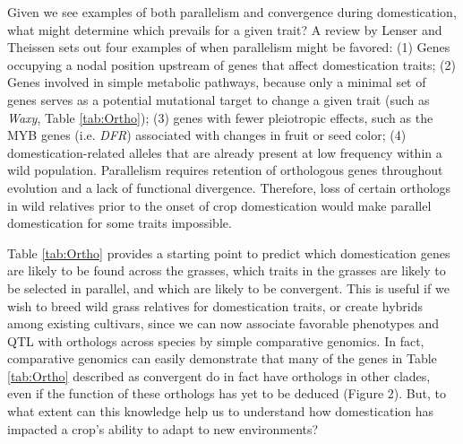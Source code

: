 \documentclass[12pt]{article}
\begin{document}
Given we see examples of both parallelism and convergence during domestication, what might determine which prevails for a given trait?
A review by Lenser and Theissen \citep{Lenser2013} sets out four examples of when parallelism might be favored: (1) Genes occupying a nodal position upstream of genes that affect domestication traits; (2) Genes involved in simple metabolic pathways, because only a minimal set of genes serves as a potential mutational target to change a given trait (such as \textit{Waxy}, Table \ref{tab:Ortho}); (3) genes with fewer pleiotropic effects, such as the MYB genes (i.e. \textit{DFR}) associated with changes in fruit or seed color; (4) domestication-related alleles that are already present at low frequency within a wild population. 
Parallelism requires retention of orthologous genes throughout evolution and a lack of functional divergence.
Therefore, loss of certain orthologs in wild relatives prior to the onset of crop domestication would make parallel domestication for some traits impossible.

Table \ref{tab:Ortho} provides a starting point to predict which domestication genes are likely to be found across the grasses, which traits in the grasses are likely to be selected in parallel, and which are likely to be convergent.
This is useful if we wish to breed wild grass relatives for domestication traits, or create hybrids among existing cultivars, since we can now associate favorable phenotypes and QTL with orthologs across species by simple comparative genomics.
In fact, comparative genomics can easily demonstrate that many of the genes in Table \ref{tab:Ortho} described as convergent do in fact have orthologs in other clades, even if the function of these orthologs has yet to be deduced (Figure 2).
But, to what extent can this knowledge help us to understand how domestication has impacted a crop's ability to adapt to new environments?
\paragraph{}
\end{document}
